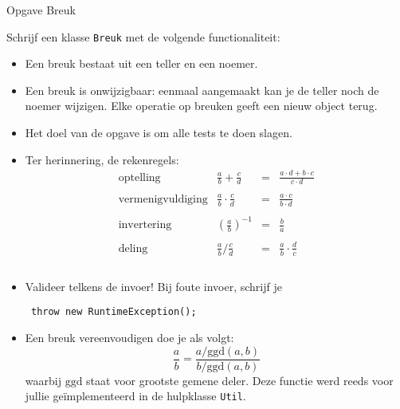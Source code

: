 \documentclass[a4paper]{article}
\begin{document}
\begin{center}
  \Huge Opgave Breuk
\end{center}
Schrijf een klasse {\tt Breuk} met de volgende functionaliteit:
\begin{itemize}
  \item Een breuk bestaat uit een teller en een noemer.
  \item Een breuk is onwijzigbaar: eenmaal aangemaakt kan je de teller noch de noemer wijzigen.
        Elke operatie op breuken geeft een nieuw object terug.
  \item Het doel van de opgave is om alle tests te doen slagen.
  \item Ter herinnering, de rekenregels:
        \[
          \begin{array}{lrcl}
            \textrm{optelling} & \displaystyle \frac ab + \frac cd & = & \displaystyle \frac{a \cdot d+b \cdot c}{c \cdot d} \\ \\
            \textrm{vermenigvuldiging} & \displaystyle \frac ab \cdot \frac cd & = & \displaystyle \frac{a \cdot c}{b \cdot d} \\ \\
            \textrm{invertering} & \displaystyle \left(\frac ab\right)^{-1} & = & \displaystyle \frac{b}{a} \\ \\
            \textrm{deling} & \displaystyle \frac ab / \frac cd & = & \displaystyle \frac ab \cdot \frac dc \\ \\
          \end{array}
        \]
  \item Valideer telkens de invoer! Bij foute invoer, schrijf je
        \begin{center} \tt
          throw new RuntimeException();
        \end{center}
  \item Een breuk vereenvoudigen doe je als volgt:
        \[
          \frac ab = \frac{a/\mathrm{ggd}(a,b)}{b/\mathrm{ggd}(a,b)}
        \]
        waarbij $\mathrm{ggd}$ staat voor grootste gemene deler. Deze functie
        werd reeds voor jullie ge\"implementeerd in de hulpklasse {\tt Util}.
\end{itemize}
\end{document}
